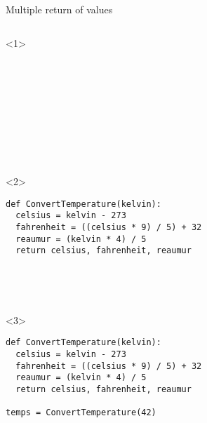 \begin{frame}[fragile]{Multiple return of values}

  \begin{columns}[onlytextwidth]
    \begin{column}{\textwidth}

      \begin{onlyenv}<1>
        \begin{lstlisting}[style=python]










 \end{lstlisting}
      \end{onlyenv}

      \begin{onlyenv}<2>
        \begin{lstlisting}[style=python]
def ConvertTemperature(kelvin):
  celsius = kelvin - 273
  fahrenheit = ((celsius * 9) / 5) + 32
  reaumur = (kelvin * 4) / 5
  return celsius, fahrenheit, reaumur





 \end{lstlisting}
      \end{onlyenv}

      \begin{onlyenv}<3>
        \begin{lstlisting}[style=python]
def ConvertTemperature(kelvin):
  celsius = kelvin - 273
  fahrenheit = ((celsius * 9) / 5) + 32
  reaumur = (kelvin * 4) / 5
  return celsius, fahrenheit, reaumur

temps = ConvertTemperature(42)



 \end{lstlisting}
      \end{onlyenv}



\end{column}
\end{columns}
\end{frame}
